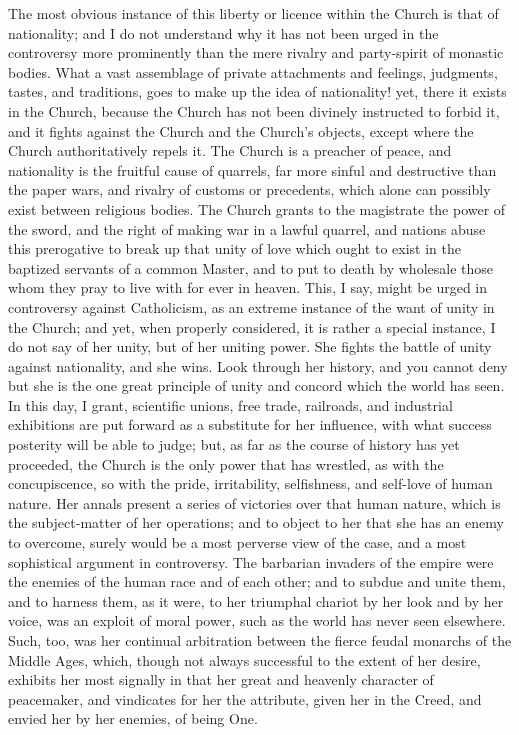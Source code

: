 The most obvious instance of this liberty or licence within the
Church is that of nationality; and I do not understand why it has not
been urged in the controversy more prominently than the mere rivalry
and party-spirit of monastic bodies. What a vast assemblage of private
attachments and feelings, judgments, tastes, and traditions, goes to
make up the idea of nationality! yet, there it exists in the Church,
because the Church has not been divinely instructed to forbid it, and
it fights against the Church and the Church's objects, except where
the Church authoritatively repels it. The Church is a preacher of
peace, and nationality is the fruitful cause of quarrels, far more
sinful and destructive than the paper wars, and rivalry of customs or
precedents, which alone can possibly exist between religious bodies.
The Church grants to the magistrate the power of the sword, and the
right of making war in a lawful quarrel, and nations abuse this
prerogative to break up that unity of love which ought to exist in the
baptized servants of a common Master, and to put to death by wholesale
those whom they pray to live with for ever in heaven. This, I say,
might be urged in controversy against Catholicism, as an extreme
instance of the want of unity in the Church; and yet, when properly
considered, it is rather a special instance, I do not say of her
unity, but of her uniting power. She fights the battle of unity
against nationality, and she wins. Look through her history, and you
cannot deny but she is the one great principle of unity and concord
which the world has seen. In this day, I grant, scientific unions,
free trade, railroads, and industrial exhibitions are put forward as a
substitute for her influence, with what success posterity will be able
to judge; but, as far as the course of history has yet proceeded, the
Church is the only power that has wrestled, as with the concupiscence,
so with the pride, irritability, selfishness, and self-love of human
nature. Her annals present a series of victories over that human
nature, which is the subject-matter of her operations; and to object
to her that she has an enemy to overcome, surely would be a most
perverse view of the case, and a most sophistical argument in
controversy. The barbarian invaders of the empire were the enemies of
the human race and of each other; and to subdue and unite them, and to
harness them, as it were, to her triumphal chariot by her look and by
her voice, was an exploit of moral power, such as the world has never
seen elsewhere. Such, too, was her continual arbitration between the
fierce feudal monarchs of the Middle Ages, which, though not always
successful to the extent of her desire, exhibits her most signally in
that her great and heavenly character of peacemaker, and vindicates
for her the attribute, given her in the Creed, and envied her by her
enemies, of being One.

